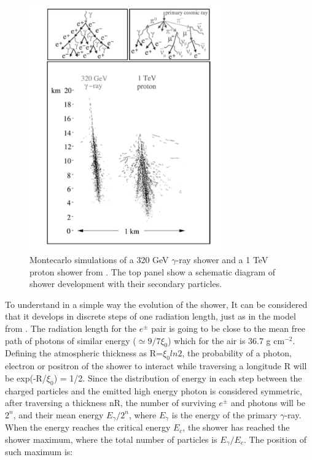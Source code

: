 \documentclass[main.tex]{subfiles}
\begin{document}
 \begin{figure}
    \centering
    \includegraphics[width=0.75\textwidth]{Pictures/eas.pdf}
    \caption{Montecarlo simulations of a 320 GeV $\gamma$-ray shower and a 1 TeV proton shower from \cite{weekes2003HEAstrophy}. The top panel show a schematic diagram of shower development with their secondary particles.}
    \label{fig:EAS}
    \end{figure}

To understand in a simple way the evolution of the shower, It can be considered that it develops in discrete steps of one radiation length, just as in the model from \cite{1954Heitler}. The radiation length for the $e^\pm$ pair is going to be close to the mean free path of photons of similar energy ($\simeq 9/7 \xi_{0}$) which for the air is 36.7 g cm$^{-2}$. Defining the atmospheric thickness as R=$\xi_{0}ln2$, the probability of a photon, electron or positron of the shower to interact while traversing a longitude R will be exp(-R/$\xi_{0}$) = 1/2. Since the distribution of energy in each step between the charged particles and the emitted high energy photon is considered symmetric, after traversing a thickness nR, the number of surviving $e^\pm$ and photons will be $2^n$, and their mean energy $E_{\gamma}/2^{n}$, where $E_\gamma$ is the energy of the primary $\gamma$-ray. When the energy reaches the critical energy $E_c$, the shower has reached the shower maximum, where the total number of particles is $E_{\gamma}/E_c$. The position of such maximum is:
\end{document}

